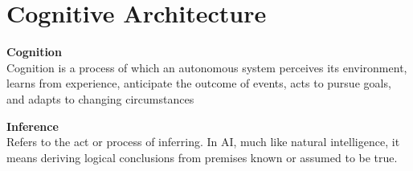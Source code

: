 \section{Cognitive Architecture}

\textbf{Cognition} \\
Cognition is a process of which an autonomous system perceives its environment, learns from experience, anticipate the outcome of events, acts to pursue goals, and adapts to changing circumstances

\textbf{Inference} \\
Refers to the act or process of inferring. In AI, much like natural intelligence, it means deriving logical conclusions from premises known or assumed to be true. 



